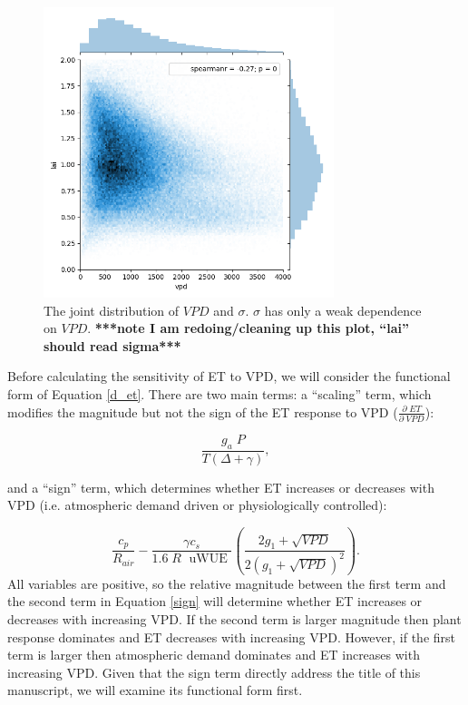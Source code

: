 \documentclass[draft,linenumbers]{agujournal}
\begin{document}
\begin{figure}[h]
\centering
\includegraphics[width=20pc]{./fig03.png}
\caption{The joint distribution of $VPD$ and $\sigma$. $\sigma$ has only a weak dependence on $VPD$. \textbf{***note I am redoing/cleaning up this plot, ``lai'' should read sigma***}}
\label{lai_vpd_fig}
\end{figure}

Before calculating the sensitivity of ET to VPD, we will consider the functional form of Equation \ref{d_et}. There are two main terms: a ``scaling'' term, which modifies the magnitude but not the sign of the ET response to VPD  ($\frac{\partial \; ET}{\partial \; VPD}$):

\begin{equation}
  \frac{g_a \; P}{T(\Delta + \gamma)},
\end{equation}

and a ``sign'' term, which determines whether ET increases or decreases with VPD  (i.e. atmospheric demand driven or physiologically controlled):

\begin{equation}
  \label{sign}
  \frac{c_p}{R_{air}} - \frac{\gamma c_s }{1.6 \; R\; \text{ uWUE }} \left( \frac{2 g_1 + \sqrt{VPD}}{2 (g_1 + \sqrt{VPD})^2}\right).
\end{equation}
All variables are positive, so the relative magnitude between the first term and the second term in Equation \ref{sign} will determine whether ET increases or decreases with increasing VPD. If the second term is larger magnitude then plant response dominates and ET decreases with increasing VPD. However, if the first term is larger then atmospheric demand dominates and ET increases with increasing VPD. Given that the sign term directly address the title of this manuscript, we will examine its functional form first.
\end{document}
